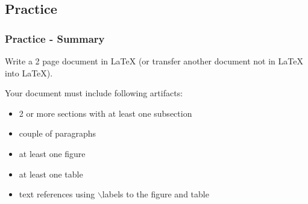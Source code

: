 \documentclass[slidestop,compress,mathserif]{beamer}
\begin{document}
\subsection[Practice]{Practice}
\begin{frame}
		\frametitle{Practice - Summary}

		Write a 2 page document in LaTeX (or transfer another document not in LaTeX into LaTeX).
		\vspace{0.5cm}
		
		Your document must include following artifacts:\\
		\begin{itemize}
			\item 2 or more sections with at least one subsection
			\item couple of paragraphs 
			\item at least one figure
			\item at least one table
			\item text references using {\color{command}$\backslash$label}s to the figure and table
		\end{itemize}
	
\end{frame}
\end{document}
